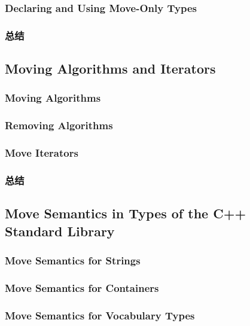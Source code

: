 \documentclass[11pt,a4paper,UTF8]{ctexart}
\begin{document}
		\subsubsection{Declaring and Using Move-Only Types}
		\subsubsection{总结}
	\subsection{Moving Algorithms and Iterators}
		\subsubsection{Moving Algorithms}
		\subsubsection{Removing Algorithms}
		\subsubsection{Move Iterators}
		\subsubsection{总结}
	\subsection{Move Semantics in Types of the C++ Standard Library}
		\subsubsection{Move Semantics for Strings}
		\subsubsection{Move Semantics for Containers}
		\subsubsection{Move Semantics for Vocabulary Types}
\end{document}
